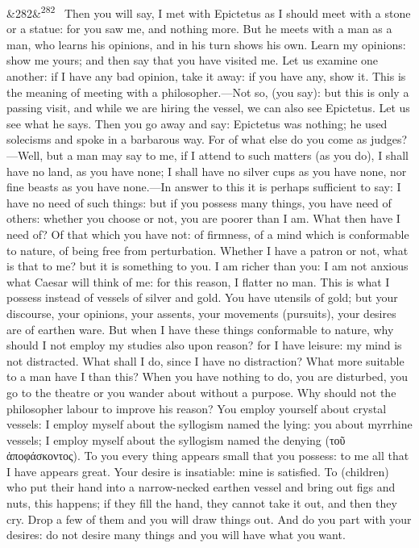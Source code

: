 \documentclass[12pt]{article}
\newcommand{\para}[1][]{\par\noindent\ifx&#1&\else\textsuperscript{\footnotesize #1}~\fi}
\begin{document}
\para[282] Then you will say, I met with Epictetus as I should meet with a stone or a statue: for you saw me, and nothing more. But he meets with a man as a man, who learns his opinions, and in his turn shows his own. Learn my opinions: show me yours; and then say that you have visited me. Let us examine one another: if I have any bad opinion, take it away: if you have any, show it. This is the meaning of meeting with a philosopher.—Not so, (you say): but this is only a passing visit, and while we are hiring the vessel, we can also see Epictetus. Let us see what he says. Then you go away and say: Epictetus was nothing; he used solecisms and spoke in a barbarous way. For of what else do you come as judges?—Well, but a man may say to me, if I attend to such matters (as you do), I shall have no land, as you have none; I shall have no silver cups as you have none, nor fine beasts as you have none.—In answer to this it is perhaps sufficient to say: I have no need of such things: but if you possess many things, you have need of others: whether you choose or not, you are poorer than I am. What then have I need of? Of that which you have not: of firmness, of a mind which is conformable to nature, of being free from perturbation. Whether I have a patron or not, what is that to me? but it is something to you. I am richer than you: I am not anxious what Caesar will think of me: for this reason, I flatter no man. This is what I possess instead of vessels of silver and gold. You have utensils of gold; but your discourse, your opinions, your assents, your movements (pursuits), your desires are of earthen ware. But when I have these things conformable to nature, why should I not employ my studies also upon reason? for I have leisure: my mind is not distracted. What shall I do, since I have no distraction? What more suitable to a man have I than this? When you have nothing to do, you are disturbed, you go to the theatre or you wander about without a purpose. Why should not the philosopher labour to improve his reason? You employ yourself about crystal vessels: I employ myself about the syllogism named the lying: you about myrrhine vessels; I employ myself about the syllogism named the denying (τοῦ ἀποφάσκοντος). To you every thing appears small that you possess: to me all that I have appears great. Your desire is insatiable: mine is satisfied. To (children) who put their hand into a narrow-necked earthen vessel and bring out figs and nuts, this happens; if they fill the hand, they cannot take it out, and then they cry. Drop a few of them and you will draw things out. And do you part with your desires: do not desire many things and you will have what you want.
\end{document}
